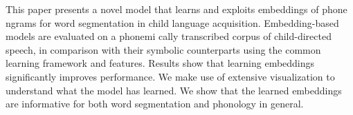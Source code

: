 This paper presents a novel model that learns and exploits embeddings of phone ngrams for word segmentation in child language acquisition. Embedding-based models are evaluated on a phonemi cally transcribed corpus of child-directed speech, in comparison with their symbolic counterparts using the common learning framework and features. Results show that learning embeddings significantly improves performance. We make use of extensive visualization to understand what the model has learned. We show that the learned embeddings are informative for both word segmentation and phonology in general.

